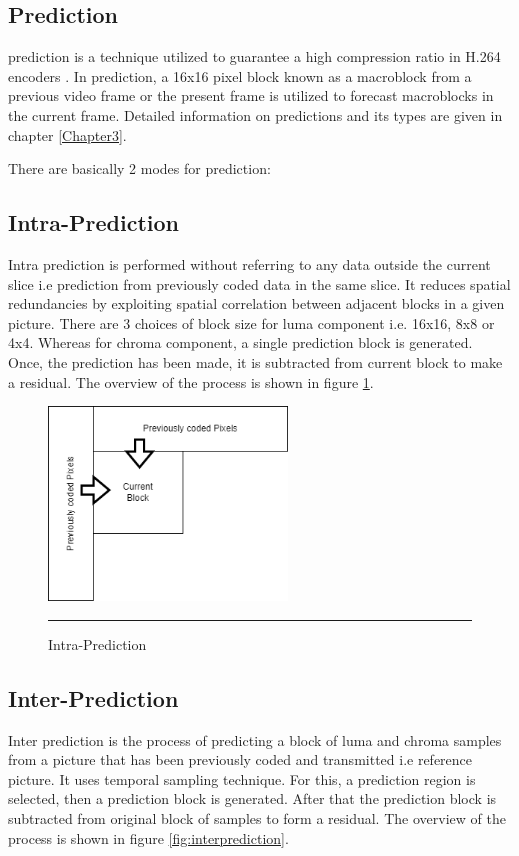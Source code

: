 \subsection{Prediction}
prediction is a technique utilized to guarantee a high compression ratio in H.264 encoders \cite{richardson2010h264}. In prediction, a 16x16 pixel block known as a macroblock from a previous video frame or the present frame is utilized to forecast macroblocks in the current frame. Detailed information on predictions and its types are given in chapter \ref{Chapter3}.

There are basically 2 modes for prediction:

\subsection{Intra-Prediction}
Intra prediction is performed without referring to any data outside the current slice i.e prediction from previously coded data in the same slice. It reduces spatial redundancies by exploiting spatial correlation between adjacent blocks in a given picture. There are 3 choices of block size for luma component i.e. 16x16, 8x8 or 4x4. Whereas for chroma component, a single prediction block is generated. Once, the prediction has been made, it is subtracted from current block to make a residual. The overview of the process is shown in figure \ref{fig:intraprediction}.

\begin{figure}[H]
	\centering
	\includegraphics[width = 2.5in]{./Figures/comp1.png}
	\rule{35em}{0.5pt}
	\caption{Intra-Prediction}
	\label{fig:intraprediction}
\end{figure}

\subsection{Inter-Prediction}
Inter prediction is the process of predicting a block of luma and chroma samples from a picture that has been previously coded and transmitted i.e reference picture. It uses temporal sampling technique. For this, a prediction region is selected, then a prediction block is generated. After that the prediction block is subtracted from original block of samples to form a residual. The overview of the process is shown in figure \ref{fig:interprediction}.

